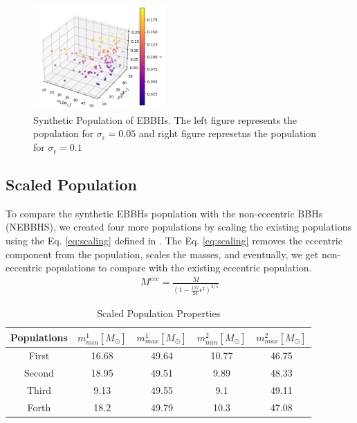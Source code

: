 \documentclass[twocolumn,prd,nofootinbib]{revtex4}
\begin{document}
\begin{figure}[H]

\includegraphics[width=0.45\textwidth]{paper/figures/pop3d0.2.png}
\caption{\label{fig:pop3d0.2} Synthetic Population of EBBHs. The left figure represents the population for $\sigma_\epsilon=0.05$ and right figure represetns the population for $\sigma_\epsilon=0.1$}

\end{figure}


\subsection{Scaled Population}

To compare the synthetic EBBHs population with the non-eccentric BBHs (NEBBHS), we created four more populations by scaling the existing populations using the Eq. \ref{eq:scaling} defined in \cite{2021_scaling_paper}. The Eq. \ref{eq:scaling} removes the eccentric component from the population, scales the masses, and eventually, we get non-eccentric populations to compare with the existing eccentric population.
\begin{align}
\label{eq:scaling}
M^{ecc} = \frac{M}{(1-\frac{157}{24}\epsilon^2)^{3/5}}
\end{align}




\begin{table}[]
    \centering
    \begin{tabular}{c|cccc}
        \hline
        Populations & $m^1_{min} [M_\odot] $ & $m^1_{max} [M_\odot]$ & $m^2_{min} [M_\odot]$ & $m^2_{max} [M_\odot]$ \\ \hline
        First & 16.68 & 49.64 & 10.77 & 46.75 \\ \hline
        Second & 18.95 & 49.51 & 9.89 & 48.33 \\ \hline
        Third & 9.13 & 49.55 & 9.1 & 49.11  \\ \hline
        Forth & 18.2 & 49.79 & 10.3 & 47.08  \\ \hline
    \end{tabular}
    \caption{Scaled Population Properties}
    \label{tab:popscl_prop}
\end{table}
 
\end{document}
